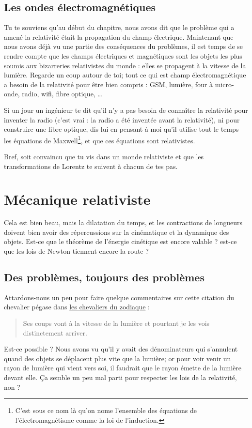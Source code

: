 \documentclass[a4paper,12pt]{book}
\theoremstyle{mes_exemples}	\newtheorem{exemple}[numtho]{Exemple}
\theoremstyle{mes_tho}
\begin{document}
\subsection{Les ondes électromagnétiques}

Tu te souviens qu'au début du chapitre, nous avons dit que le problème qui a amené la relativité était la propagation du champ électrique. Maintenant que nous avons déjà vu une partie des conséquences du problèmes, il est temps de se rendre compte que les champs électriques et magnétiques sont les objets les plus soumis aux bizarreries relativistes du monde : elles se propagent à la vitesse de la lumière. Regarde un coup autour de toi; tout ce qui est champ électromagnétique a besoin de la relativité pour être bien compris : GSM, lumière, four à micro-onde, radio, wifi, fibre optique, \ldots

Si un jour un ingénieur te dit qu'il n'y a pas besoin de connaître la relativité pour inventer la radio (c'est vrai : la radio a été inventée avant la relativité), ni pour construire une fibre optique, dis lui en pensant à moi qu'il utilise tout le temps les équations de Maxwell\footnote{C'est sous ce nom là qu'on nome l'ensemble des équations de l'électromagnétisme comme la loi de l'induction.}, et que ces équations sont relativistes.

Bref, soit convaincu que tu vis dans un monde relativiste et que les transformations de Lorentz te suivent à chacun de tes pas.

\section{Mécanique relativiste}

Cela est bien beau, mais la dilatation du temps, et les contractions de longueurs doivent bien avoir des répercussions sur la cinématique et la dynamique des objets. Est-ce que le théorème de l'énergie cinétique est encore valable ? est-ce que les lois de Newton tiennent encore la route ?


\subsection{Des problèmes, toujours des problèmes}


Attardons-nous un peu pour faire quelque commentaires sur cette citation du chevalier pégase dans \href{http://fr.wikipedia.org/wiki/Les_Chevaliers_du_Zodiaque}{les chevaliers du zodiaque} : 
\begin{quote}
Ses coups vont à la vitesse de la lumière et pourtant je les vois distinctement arriver.  
\end{quote}
Est-ce possible ? Nous avons vu qu'il y avait des dénominateurs qui s'annulent quand des objets se déplacent plus vite que la lumière; or pour voir venir un rayon de lumière qui vient vers soi, il faudrait que le rayon émette de la lumière devant elle. Ça semble un peu mal parti pour respecter les lois de la relativité, non ?
\end{document}
